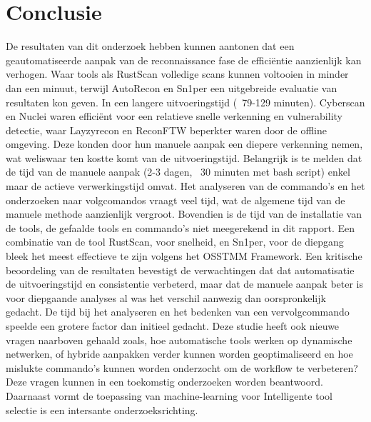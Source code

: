 
\chapter{Conclusie}%
\label{ch:conclusie}


De resultaten van dit onderzoek hebben kunnen aantonen dat een geautomatiseerde aanpak van de reconnaissance fase de efficiëntie aanzienlijk kan verhogen.
Waar tools als RustScan volledige scans kunnen voltooien in minder dan een minuut, terwijl AutoRecon en Sn1per een uitgebreide evaluatie van resultaten kon geven. In een langere uitvoeringstijd (~79-129 minuten).
Cyberscan en Nuclei waren efficiënt voor een relatieve snelle verkenning en vulnerability detectie, waar Layzyrecon en ReconFTW beperkter waren door de offline omgeving.
Deze konden door hun manuele aanpak een diepere verkenning nemen, wat weliswaar ten kostte komt van de uitvoeringstijd.
Belangrijk is te melden dat de tijd van de manuele aanpak (2-3 dagen, ~30 minuten met bash script) enkel maar de actieve verwerkingstijd omvat.
Het analyseren van de commando's en het onderzoeken naar volgcomandos vraagt veel tijd, wat de algemene tijd van de manuele methode aanzienlijk vergroot.
Bovendien is de tijd van de installatie van de tools, de gefaalde tools en commando's niet meegerekend in dit rapport.
Een combinatie van de tool RustScan, voor snelheid, en Sn1per, voor de diepgang bleek het meest effectieve te zijn volgens het OSSTMM Framework.
Een kritische beoordeling van de resultaten bevestigt de verwachtingen dat dat automatisatie de uitvoeringstijd en consistentie verbeterd, maar dat de manuele aanpak beter is voor diepgaande analyses al was het verschil aanwezig dan oorspronkelijk gedacht.
De tijd bij het analyseren en het bedenken van een vervolgcommando speelde een grotere factor dan initieel gedacht.
Deze studie heeft ook nieuwe vragen naarboven gehaald zoals, hoe automatische tools werken op dynamische netwerken, of hybride aanpakken verder kunnen worden geoptimaliseerd en hoe mislukte commando's kunnen worden onderzocht om de workflow te verbeteren?
Deze vragen kunnen in een toekomstig onderzoeken worden beantwoord. Daarnaast vormt de toepassing van machine-learning voor Intelligente tool selectie is een intersante onderzoeksrichting.